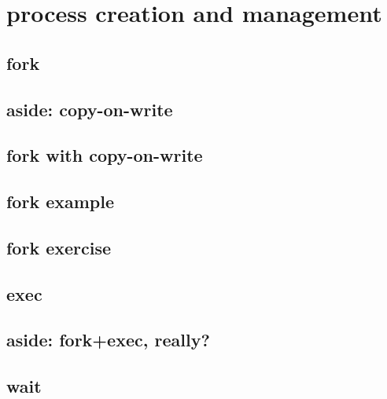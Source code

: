 
\section{process creation and management}





\subsection{fork}



\subsection{aside: copy-on-write}


\subsection{fork with copy-on-write}



\subsection{fork example}


\subsection{fork exercise}


\subsection{exec}






\subsection{aside: fork+exec, really?}



\subsection{wait}

